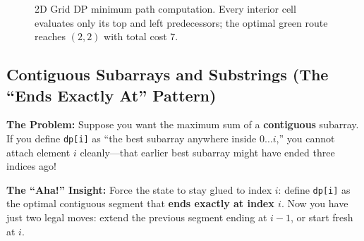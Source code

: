 \documentclass[11pt,a4paper]{article}
\theoremstyle{definition}
\newcommand{\painbeat}{\textbf{\color{accentamber}The Problem:} }
\newcommand{\ahabeat}{\textbf{\color{accentteal}The ``Aha!'' Insight:} }
\begin{document}
\begin{figure}[htbp]
\caption{2D Grid DP minimum path computation. Every interior cell evaluates only its top and left predecessors; the optimal green route reaches $(2, 2)$ with total cost $7$.}
\label{fig:dp-2d-grid}
\end{figure}

\subsection{Contiguous Subarrays and Substrings (The ``Ends Exactly At'' Pattern)}

\painbeat Suppose you want the maximum sum of a \textbf{contiguous} subarray. If you define \texttt{dp[i]} as ``the best subarray anywhere inside $0 \dots i$,'' you cannot attach element $i$ cleanly---that earlier best subarray might have ended three indices ago!

\ahabeat Force the state to stay glued to index $i$: define \texttt{dp[i]} as the optimal contiguous segment that \textbf{ends exactly at index $i$}. Now you have just two legal moves: extend the previous segment ending at $i-1$, or start fresh at $i$.
\end{document}
